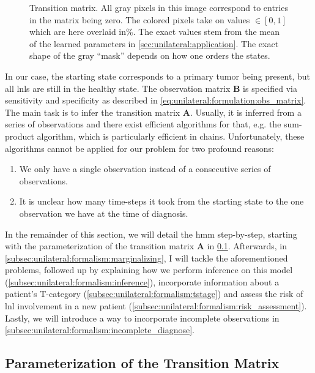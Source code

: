 \documentclass[\relativeRoot/main.tex]{subfiles}
\begin{document}
\begin{figure}
    \centering
    \def\svgwidth{0.8\textwidth}
    
    \caption[The HMM's transition matrix]{Transition matrix. All gray pixels in this image correspond to entries in the matrix being zero. The colored pixels take on values $\in [0, 1]$ which are here overlaid in\%. The exact values stem from the mean of the learned parameters in \cref{sec:unilateral:application}. The exact shape of the gray ``mask'' depends on how one orders the states.}
    \label{fig:unilateral:trans_matrix}
\end{figure}

In our case, the starting state corresponds to a primary tumor being present, but all \glspl{lnl} are still in the healthy state. The observation matrix $\mathbf{B}$ is specified via sensitivity and specificity as described in \cref{eq:unilateral:formulation:obs_matrix}. The main task is to infer the transition matrix $\mathbf{A}$. Usually, it is inferred from a series of observations and there exist efficient algorithms for that, e.g. the sum-product algorithm, which is particularly efficient in chains. Unfortunately, these algorithms cannot be applied for our problem for two profound reasons:

\begin{enumerate}
    \item We only have a single observation instead of a consecutive series of observations. 
    \item It is unclear how many time-steps it took from the starting state to the one observation we have at the time of diagnosis.
\end{enumerate}

In the remainder of this section, we will detail the \gls{hmm} step-by-step, starting with the parameterization of the transition matrix $\mathbf{A}$ in \cref{subsec:unilateral:formalism:parametrization}. Afterwards, in \cref{subsec:unilateral:formalism:marginalizing}, I will tackle the aforementioned problems, followed up by explaining how we perform inference on this model (\cref{subsec:unilateral:formalism:inference}), incorporate information about a patient's T-category (\cref{subsec:unilateral:formalism:tstage}) and assess the risk of \gls{lnl} involvement in a new patient (\cref{subsec:unilateral:formalism:risk_assessment}). Lastly, we will introduce a way to incorporate incomplete observations in \cref{subsec:unilateral:formalism:incomplete_diagnose}.

\subsection{Parameterization of the Transition Matrix}
\label{subsec:unilateral:formalism:parametrization}
\end{document}
